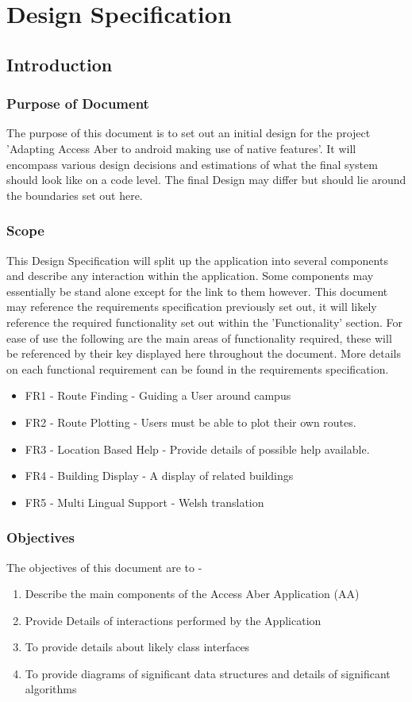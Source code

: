 \chapter{Design Specification}
\tableofcontents
\newpage
\section{Introduction}
\subsection{Purpose of Document}
The purpose of this document is to set out an initial design for the project 'Adapting Access Aber to android making use of native features'. It will encompass various design decisions and estimations of what the final system should look like on a code level. The final Design may differ but should lie around the boundaries set out here.
\subsection{Scope}
This Design Specification will split up the application into several components and describe any interaction within the application. Some components may essentially be stand alone except for the link to them however. This document may reference the requirements specification previously set out, it will likely reference the required functionality set out within the 'Functionality' section. For ease of use the following are the main areas of functionality required, these will be referenced by their key displayed here throughout the document. More details on each functional requirement can be found in the requirements specification.

\begin{itemize}
	\item FR1 - Route Finding - Guiding a User around campus
	\item FR2 - Route Plotting - Users must be able to plot their own routes.
	\item FR3 - Location Based Help - Provide details of possible help available.
	\item FR4 - Building Display - A display of related buildings
	\item FR5 - Multi Lingual Support - Welsh translation
\end{itemize}
 

\subsection{Objectives}
The objectives of this document are to - 
\begin{enumerate}
\item Describe the main components of the Access Aber Application (AA)
\item Provide Details of interactions performed by the Application
\item To provide details about likely class interfaces
\item To provide diagrams of significant data structures and details of significant algorithms 
\end{enumerate}
\newpage
